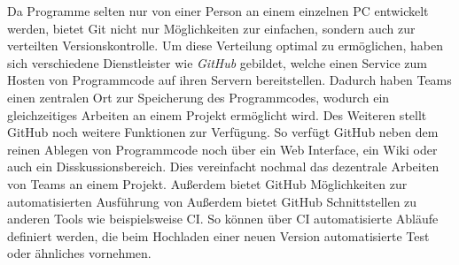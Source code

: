 Da Programme selten nur von einer Person an einem einzelnen PC entwickelt
werden, bietet Git nicht nur Möglichkeiten zur einfachen, sondern auch zur
verteilten Versionskontrolle. Um diese Verteilung optimal zu ermöglichen, haben
sich verschiedene Dienstleister wie \textit{GitHub} gebildet, welche einen
Service zum Hosten von Programmcode auf ihren Servern bereitstellen. Dadurch
haben Teams einen zentralen Ort zur Speicherung des Programmcodes,
wodurch ein gleichzeitiges Arbeiten an einem Projekt ermöglicht wird. Des
Weiteren stellt GitHub noch weitere Funktionen zur Verfügung. So verfügt GitHub
neben dem reinen Ablegen von Programmcode noch über ein Web Interface, ein Wiki
oder auch ein Disskussionsbereich. Dies vereinfacht nochmal das dezentrale
Arbeiten von Teams an einem Projekt. Außerdem bietet GitHub Möglichkeiten zur
automatisierten Ausführung von Außerdem bietet GitHub Schnittstellen zu anderen
Tools wie beispielsweise \ac{CI}. So können über \ac{CI} automatisierte Abläufe
definiert werden, die beim Hochladen einer neuen Version automatisierte Test
oder ähnliches vornehmen.  \autocite{bell_2014}
